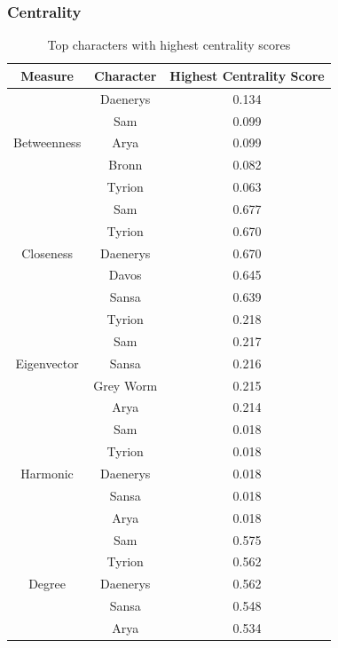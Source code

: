 \documentclass[10pt,twocolumn,letterpaper]{article}
\begin{document}
\subsubsection{Centrality}

\begin{table}[!h]
    \centering
    \small
    \begin{tabular}{c|c|c}
        Measure & Character & \small{Highest Centrality Score} \\
        \hline
                    & Daenerys & 0.134 \\
                    & Sam & 0.099 \\
        Betweenness & Arya & 0.099 \\
                    & Bronn & 0.082 \\
                    & Tyrion & 0.063 \\
        \hline 
           & Sam & 0.677 \\
                    & Tyrion & 0.670 \\
        Closeness   & Daenerys & 0.670 \\
                    & Davos & 0.645 \\
                    & Sansa & 0.639 \\
        \hline 
                    & Tyrion & 0.218 \\
                    & Sam & 0.217 \\
        Eigenvector & Sansa & 0.216 \\
                    & Grey Worm & 0.215 \\
                    & Arya & 0.214 \\
        \hline 
                    & Sam & 0.018\\
                    & Tyrion & 0.018 \\
        Harmonic    & Daenerys & 0.018 \\
                    & Sansa & 0.018 \\
                    & Arya & 0.018 \\
        \hline
                    & Sam & 0.575 \\
                    & Tyrion & 0.562 \\
        Degree      & Daenerys & 0.562 \\
                    & Sansa & 0.548 \\
                    & Arya & 0.534 \\
        \hline
    \end{tabular}
    \vspace{0.2cm}
    \caption{Top characters with highest centrality scores}
    \label{tab:my_label}
\end{table}
\end{document}
